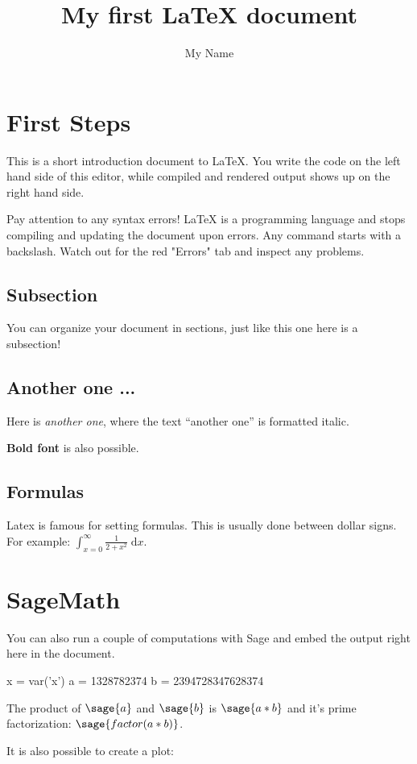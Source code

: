 \documentclass{article}
\title{My first \LaTeX{} document}
\author{My Name}
\begin{document}
\section{First Steps}

This is a short introduction document to \LaTeX{}.
You write the code on the left hand side of this editor,
while compiled and rendered output shows up on the right hand side.

Pay attention to any syntax errors!
\LaTeX{} is a programming language and stops compiling and updating the document upon errors.
Any command starts with a backslash.
Watch out for the red "Errors" tab and inspect any problems.

\subsection{Subsection}

You can organize your document in sections,
just like this one here is a subsection!

\subsection{Another one ...}

Here is \textit{another one},
where the text ``another one'' is formatted italic.

\textbf{Bold font} is also possible.

\subsection{Formulas}

Latex is famous for setting formulas.
This is usually done between dollar signs.
For example: $\int_{x=0}^{\infty} \frac{1}{2 + x^2}\;\mathrm{d}x$.

\section{SageMath}

You can also run a couple of computations with Sage and embed the output right here in the document.

\begin{sagesilent}
x = var('x')
a = 1328782374
b = 2394728347628374
\end{sagesilent}

The product of $\sage{a}$ and $\sage{b}$  is $\sage{a*b}$
and it's prime factorization: $\sage{factor(a*b)}$.

It is also possible to create a plot:

\begin{center}
\end{center}
\end{document}
